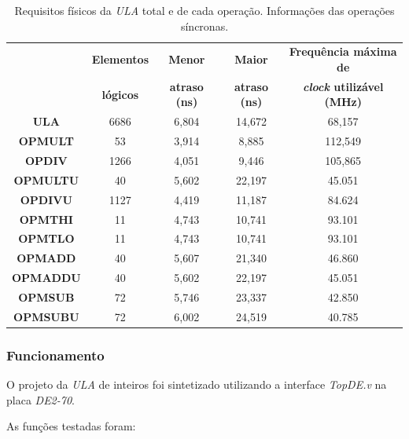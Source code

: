 \documentclass[12pt]{article}
\begin{document}
\begin{table}[H]
	\centering
	\begin{tabular}{|c|c|c|c|c|}
		\hline
		& \textbf{Elementos} & \textbf{Menor} & \textbf{Maior} & \textbf{Frequência máxima de} \\
		& \textbf{lógicos} & \textbf{atraso (ns)} &  \textbf{atraso (ns)} & \textbf{\textit{clock} utilizável (MHz)} \\
		\hline
		\textbf{ULA} & 6686 & 6,804 & 14,672 &  68,157 \\\hline
		\textbf{OPMULT} & 53 & 3,914 & 8,885 & 112,549 \\\hline
		\textbf{OPDIV} & 1266 & 4,051 & 9,446 & 105,865 \\\hline
		\textbf{OPMULTU} & 40 & 5,602 & 22,197 & 45.051 \\\hline
		\textbf{OPDIVU} & 1127 & 4,419 & 11,187 & 84.624 \\\hline
		\textbf{OPMTHI} & 11 & 4,743 & 10,741 & 93.101 \\\hline
		\textbf{OPMTLO} & 11 & 4,743 & 10,741 & 93.101 \\\hline
		\textbf{OPMADD} & 40 & 5,607 & 21,340 & 46.860 \\\hline
		\textbf{OPMADDU} & 40 & 5,602 & 22,197 & 45.051 \\\hline
		\textbf{OPMSUB} & 72 & 5,746 & 23,337 & 42.850 \\\hline
		\textbf{OPMSUBU}  & 72 & 6,002 & 24,519 & 40.785 \\\hline
	\end{tabular}
	\caption{Requisitos físicos da \textit{ULA} total e de cada operação. Informações das operações síncronas.}
	\label{tab:req22}
\end{table}

\subsubsection{Funcionamento}
\label{subsubsec:ulafunc}

O projeto da \textit{ULA} de inteiros foi sintetizado utilizando a interface \textit{TopDE.v} na placa \textit{DE2-70}.

As funções testadas foram:
\end{document}
